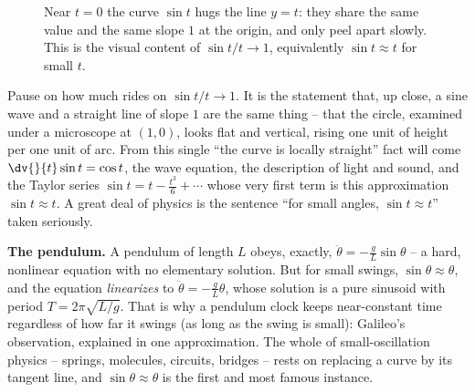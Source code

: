 \begin{figure}[H]
\centering
{}
\caption{Near $t=0$ the curve $\sin t$ hugs the line $y=t$: they share the same value and the same slope $1$ at the origin, and only peel apart slowly. This is the visual content of $\sin t/t\to 1$, equivalently $\sin t\approx t$ for small $t$.}
\label{ch04:fig-sint-approx-t}
\end{figure}

\begin{aestheticbox}
Pause on how much rides on $\sin t/t\to 1$. It is the statement that, up close, a sine wave and a straight line of slope $1$ are the same thing -- that the circle, examined under a microscope at $(1,0)$, looks flat and vertical, rising one unit of height per one unit of arc. From this single ``the curve is locally straight'' fact will come $\dv{}{t}\sin t = \cos t$, the wave equation, the description of light and sound, and the Taylor series $\sin t = t - \tfrac{t^3}{6} + \cdots$ whose very first term is this approximation $\sin t\approx t$. A great deal of physics is the sentence ``for small angles, $\sin t \approx t$'' taken seriously.
\end{aestheticbox}

\begin{applicationbox}
\textbf{The pendulum.} A pendulum of length $L$ obeys, exactly, $\ddot\theta = -\tfrac{g}{L}\sin\theta$ -- a hard, nonlinear equation with no elementary solution. But for small swings, $\sin\theta \approx \theta$, and the equation \emph{linearizes} to $\ddot\theta = -\tfrac{g}{L}\theta$, whose solution is a pure sinusoid with period $T = 2\pi\sqrt{L/g}$. That is why a pendulum clock keeps near-constant time regardless of how far it swings (as long as the swing is small): Galileo's observation, explained in one approximation. The whole of small-oscillation physics -- springs, molecules, circuits, bridges -- rests on replacing a curve by its tangent line, and $\sin\theta\approx\theta$ is the first and most famous instance.
\end{applicationbox}


